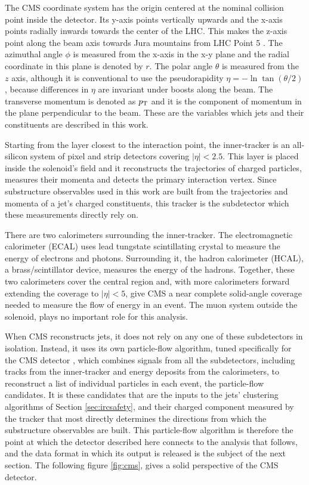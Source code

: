 The CMS coordinate system has the origin centered at the nominal collision point inside the detector. Its
y-axis points vertically upwards and the x-axis points radially inwards towards the center of the LHC.
This makes the z-axis point along the beam axis towards Jura mountains from LHC Point 5 \cite{CMS:2008}.
The azimuthal angle $\phi$ is measured
from the x-axis in the x-y plane and the radial coordinate in this plane is denoted by $r$. The polar
angle $\theta$ is measured from the $z$ axis, although it is conventional to use the pseudorapidity
$\eta = -\ln\tan(\theta/2)$, because differences in $\eta$ are invariant under boosts along the beam.
The transverse momentum is denoted as $p_{\mathrm{T}}$ and it is the component of momentum in the plane perpendicular
to the beam. These are the variables which jets and their constituents are described in this work.

Starting from the layer closest to the interaction point, the inner-tracker is an all-silicon
system of pixel and strip detectors covering $|\eta| < 2.5$. This layer is placed inside the solenoid's
field and it reconstructs the trajectories of charged particles, measures their momenta and detects 
the primary interaction vertex. Since substructure observables used in this work are built from 
the trajectories and momenta of a jet's charged constituents, this tracker is the subdetector which
these measurements directly rely on.

There are two calorimeters surrounding the inner-tracker. The electromagnetic calorimeter (ECAL) uses
lead tungstate scintillating crystal to measure the energy of electrons and photons. Surrounding it,
the hadron calorimeter (HCAL), a brass/scintillator device, measures the energy of the hadrons. Together,
these two calorimeters cover the central region and, with more calorimeters forward extending the coverage
to $|\eta| < 5$, give CMS a near complete solid-angle coverage needed to measure the flow of energy in an event.
The muon system outside the solenoid, plays no important role for this analysis.

When CMS reconstructs jets, it does not rely on any one of these subdetectors in isolation. Instead,
it uses its own particle-flow algorithm, tuned specifically for the CMS detector \cite{CMS:2017}, which
combines signals from all the subdetectors, including tracks from the inner-tracker and energy deposits from
the calorimeters, to reconstruct a list of individual particles in
each event, the particle-flow candidates. It is these candidates that are the inputs to the jets'
clustering algorithms of Section \ref{sec:ircsafety}, and their charged component measured by the tracker
that most directly determines the directions from which the substructure observables are built.
This particle-flow algorithm is therefore the point at
which the detector described here connects to the analysis that follows, and the
data format in which its output is released is the subject of the next section. The following
figure \ref{fig:cms}, gives a solid perspective of the CMS detector. 


